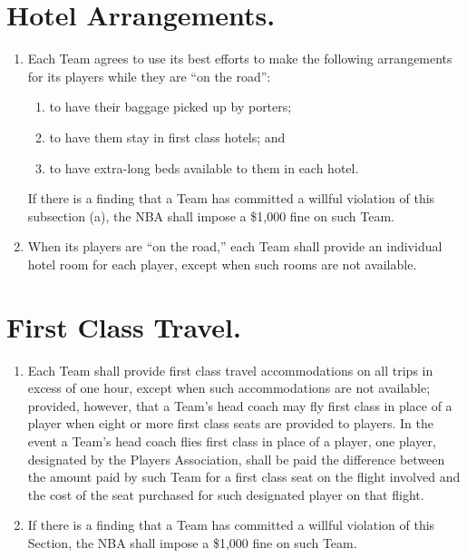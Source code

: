 \documentclass[
]{book}
\providecommand{\tightlist}{%
  \setlength{\itemsep}{0pt}\setlength{\parskip}{0pt}}
\begin{document}

\hypertarget{hotel-arrangements.}{%
\section{Hotel Arrangements.}\label{hotel-arrangements.}}

\begin{enumerate}
\def\labelenumi{(\alph{enumi})}
\tightlist
\item
  Each Team agrees to use its best efforts to make the following arrangements for its players while they are ``on the road'':

  \begin{enumerate}
  \def\labelenumii{(\arabic{enumii})}
  \tightlist
  \item
    to have their baggage picked up by porters;
  \item
    to have them stay in first class hotels; and
  \item
    to have extra-long beds available to them in each hotel.
  \end{enumerate}

  If there is a finding that a Team has committed a willful violation of this subsection (a), the NBA shall impose a \$1,000 fine on such Team.
\item
  When its players are ``on the road,'' each Team shall provide an individual hotel room for each player, except when such rooms are not available.
\end{enumerate}

\hypertarget{first-class-travel.}{%
\section{First Class Travel.}\label{first-class-travel.}}

\begin{enumerate}
\def\labelenumi{(\alph{enumi})}
\tightlist
\item
  Each Team shall provide first class travel accommodations on all trips in excess of one hour, except when such accommodations are not available; provided, however, that a Team's head coach may fly first class in place of a player when eight or more first class seats are provided to players. In the event a Team's head coach flies first class in place of a player, one player, designated by the Players Association, shall be paid the difference between the amount paid by such Team for a first class seat on the flight involved and the cost of the seat purchased for such designated player on that flight.
\item
  If there is a finding that a Team has committed a willful violation of this Section, the NBA shall impose a \$1,000 fine on such Team.
\end{enumerate}
\end{document}
